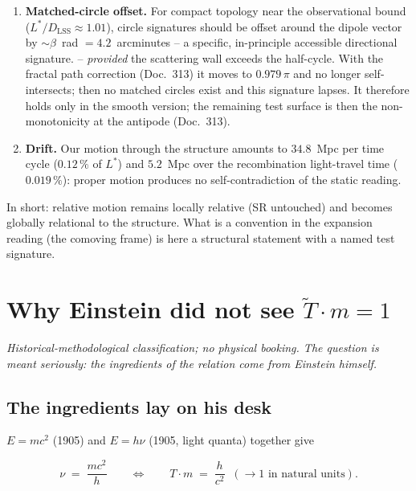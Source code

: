 \documentclass[11pt]{report}
\begin{document}
\begin{enumerate}
  \item \textbf{Matched-circle offset.} For compact topology near
        the observational bound ($L^{*}/D_\text{LSS} \approx
        1.01$), circle signatures should be offset around the
        dipole vector by $\sim\beta$~rad $= 4.2$~arcminutes -- a
        specific, in-principle accessible directional signature.
        -- \emph{provided} the scattering wall exceeds the
        half-cycle. With the fractal path correction (Doc.~313) it
        moves to $0.979\,\pi$ and no longer self-intersects; then
        no matched circles exist and this signature lapses. It
        therefore holds only in the smooth version; the remaining
        test surface is then the non-monotonicity at the antipode
        (Doc.~313).
  \item \textbf{Drift.} Our motion through the structure amounts
        to $34.8$~Mpc per time cycle ($0.12\,\%$ of $L^{*}$) and
        $5.2$~Mpc over the recombination light-travel time
        ($0.019\,\%$): proper motion produces no
        self-contradiction of the static reading.
\end{enumerate}

In short: relative motion remains locally relative (SR untouched)
and becomes globally relational to the structure. What is a
convention in the expansion reading (the comoving frame) is here a
structural statement with a named test signature.

\chapter{Why Einstein did not see $\tilde T \cdot m = 1$}

\emph{Historical-methodological classification; no physical
booking. The question is meant seriously: the ingredients of the
relation come from Einstein himself.}

\section{The ingredients lay on his desk}

$E = mc^2$ (1905) and $E = h\nu$ (1905, light quanta) together
give

\begin{equation}
  \nu \;=\; \frac{mc^2}{h}
  \qquad\Longleftrightarrow\qquad
  T \cdot m \;=\; \frac{h}{c^2} \;\;(\to 1
  \text{ in natural units}).
\end{equation}
\end{document}
